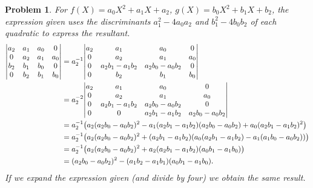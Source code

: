 \documentclass{article}
\theoremstyle{pprop}
\newtheorem{problem}{Problem}[section]
\begin{document}
\begin{problem}
For $f(X)=a_0X^2+a_1X+a_2$, $g(X)=b_0X^2+b_1X+b_2$, the expression given uses the discriminants $a_1^2-4a_0a_2$ and $b_1^2-4b_0b_2$
of each quadratic to express the resultant.  
\begin{align*}
\mqty|
a_2 & a_1 & a_0 & 0   \\
0   & a_2 & a_1 & a_0 \\
b_2 & b_1 & b_0 & 0   \\
0   & b_2 & b_1 & b_0 \\
| & = 
a_2^{-1}
\mqty|
a_2 & a_1 & a_0 & 0   \\
0   & a_2 & a_1 & a_0 \\
0   & a_2b_1-a_1b_2 & a_2b_0-a_0b_2 & 0   \\
0   & b_2 & b_1 & b_0 \\
| \\
& = a_2^{-2}
\mqty|
a_2 & a_1 & a_0 & 0   \\
0   & a_2 & a_1 & a_0 \\
0   & a_2b_1-a_1b_2 & a_2b_0-a_0b_2 & 0   \\
0   & 0 & a_2b_1-a_1b_2 & a_2b_0-a_0b_2 \\
| \\
&= a_2^{-1}
\qty(a_2(a_2b_0-a_0b_2)^2-a_1(a_2b_1-a_1b_2)(a_2b_0-a_0b_2)+a_0(a_2b_1-a_1b_2)^2) \\
&= a_2^{-1}
\qty(a_2(a_2b_0-a_0b_2)^2 +(a_2b_1-a_1b_2) (a_0(a_2b_1-a_1b_2)-a_1(a_1b_0-a_0b_2))) \\
&= a_2^{-1}
\qty(a_2(a_2b_0-a_0b_2)^2 +a_2(a_2b_1-a_1b_2) (a_0b_1-a_1b_0)) \\
& = (a_2b_0-a_0b_2)^2-(a_1b_2-a_1b_1)(a_0b_1-a_1b_0).
\end{align*}
If we expand the expression given (and divide by four) we obtain the same result.
\end{problem}
\end{document}
